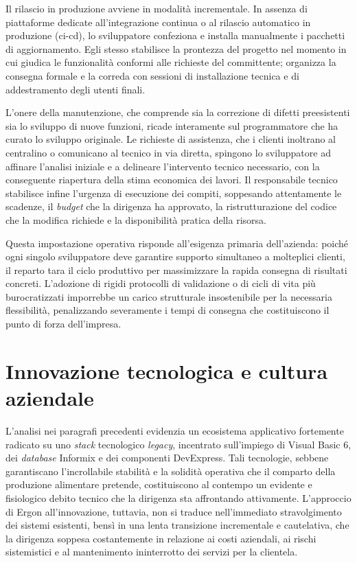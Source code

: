 Il rilascio in produzione avviene in modalità incrementale. In assenza di piattaforme dedicate all'integrazione continua o al rilascio automatico in produzione (\gls{ci-cd}), lo sviluppatore confeziona e installa manualmente i pacchetti di aggiornamento. Egli stesso stabilisce la prontezza del progetto nel momento in cui giudica le funzionalità conformi alle richieste del committente; organizza la consegna formale e la correda con sessioni di installazione tecnica e di addestramento degli utenti finali.

L'onere della manutenzione, che comprende sia la correzione di difetti preesistenti sia lo sviluppo di nuove funzioni, ricade interamente sul programmatore che ha curato lo sviluppo originale. Le richieste di assistenza, che i clienti inoltrano al centralino o comunicano al tecnico in via diretta, spingono lo sviluppatore ad affinare l'analisi iniziale e a delineare l'intervento tecnico necessario, con la conseguente riapertura della stima economica dei lavori. Il responsabile tecnico stabilisce infine l'urgenza di esecuzione dei compiti, soppesando attentamente le scadenze, il \textit{budget} che la dirigenza ha approvato, la ristrutturazione del codice che la modifica richiede e la disponibilità pratica della risorsa.

Questa impostazione operativa risponde all'esigenza primaria dell'azienda: poiché ogni singolo sviluppatore deve garantire supporto simultaneo a molteplici clienti, il reparto tara il ciclo produttivo per massimizzare la rapida consegna di risultati concreti. L'adozione di rigidi protocolli di validazione o di cicli di vita più burocratizzati imporrebbe un carico strutturale insostenibile per la necessaria flessibilità, penalizzando severamente i tempi di consegna che costituiscono il punto di forza dell'impresa.

\section{Innovazione tecnologica e cultura aziendale}
\label{sec:innovazione_tecnologica}

L'analisi nei paragrafi precedenti evidenzia un ecosistema applicativo fortemente radicato su uno \textit{stack} tecnologico \textit{legacy}, incentrato sull'impiego di Visual Basic 6, dei \textit{database} Informix e dei componenti DevExpress. Tali tecnologie, sebbene garantiscano l'incrollabile stabilità e la solidità operativa che il comparto della produzione alimentare pretende, costituiscono al contempo un evidente e fisiologico debito tecnico che la dirigenza sta affrontando attivamente. L'approccio di Ergon all'innovazione, tuttavia, non si traduce nell'immediato stravolgimento dei sistemi esistenti, bensì in una lenta transizione incrementale e cautelativa, che la dirigenza soppesa costantemente in relazione ai costi aziendali, ai rischi sistemistici e al mantenimento ininterrotto dei servizi per la clientela.

